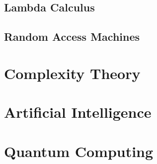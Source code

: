 


\subsection{Lambda Calculus}

\subsection{Random Access Machines}



\section{Complexity Theory}




\section{Artificial Intelligence}






\section{Quantum Computing}




